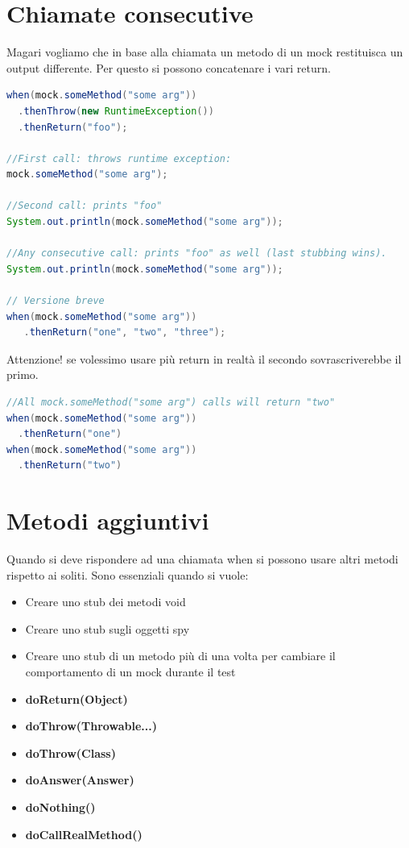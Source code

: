 \documentclass[11pt,a4paper]{book}
\begin{document}
\section{Chiamate consecutive}
Magari vogliamo che in base alla chiamata un metodo di un mock restituisca un output differente. Per questo si possono concatenare i vari return.
\begin{lstlisting}[language = Java]
when(mock.someMethod("some arg"))
  .thenThrow(new RuntimeException())
  .thenReturn("foo");

//First call: throws runtime exception:
mock.someMethod("some arg");

//Second call: prints "foo"
System.out.println(mock.someMethod("some arg"));

//Any consecutive call: prints "foo" as well (last stubbing wins).
System.out.println(mock.someMethod("some arg"));

// Versione breve
when(mock.someMethod("some arg"))
   .thenReturn("one", "two", "three");
\end{lstlisting}

Attenzione! se volessimo usare più return in realtà il secondo sovrascriverebbe il primo.
\begin{lstlisting}[language = Java]
//All mock.someMethod("some arg") calls will return "two"
when(mock.someMethod("some arg"))
  .thenReturn("one")
when(mock.someMethod("some arg"))
  .thenReturn("two")
\end{lstlisting}

\section{Metodi aggiuntivi}
Quando si deve rispondere ad una chiamata when si possono usare altri metodi rispetto ai soliti. Sono essenziali quando si vuole:
\begin{itemize}
	\item Creare uno stub dei metodi void
	\item Creare uno stub sugli oggetti spy
	\item Creare uno stub di un metodo più di una volta per cambiare il comportamento di un mock durante il test
\end{itemize}

\begin{itemize}
	\item \textbf{doReturn(Object)}
	\item \textbf{doThrow(Throwable...)}
	\item \textbf{doThrow(Class)}
	\item \textbf{doAnswer(Answer)}
	\item \textbf{doNothing()}
	\item \textbf{doCallRealMethod()}
\end{itemize}
\end{document}
